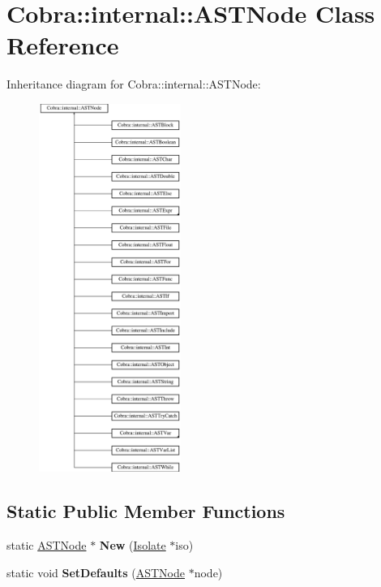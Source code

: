 \hypertarget{class_cobra_1_1internal_1_1_a_s_t_node}{\section{Cobra\+:\+:internal\+:\+:A\+S\+T\+Node Class Reference}
\label{class_cobra_1_1internal_1_1_a_s_t_node}
}
Inheritance diagram for Cobra\+:\+:internal\+:\+:A\+S\+T\+Node\+:\begin{figure}[H]
\begin{center}
\leavevmode
\includegraphics[height=12.000000cm]{class_cobra_1_1internal_1_1_a_s_t_node}
\end{center}
\end{figure}
\subsection*{Static Public Member Functions}
\begin{DoxyCompactItemize}
\item 
\hypertarget{class_cobra_1_1internal_1_1_a_s_t_node_af0d28a5cab4bc78d576d036b55f834f4}{static \hyperlink{class_cobra_1_1internal_1_1_a_s_t_node}{A\+S\+T\+Node} $\ast$ {\bfseries New} (\hyperlink{class_cobra_1_1internal_1_1_isolate}{Isolate} $\ast$iso)}\label{class_cobra_1_1internal_1_1_a_s_t_node_af0d28a5cab4bc78d576d036b55f834f4}

\item 
\hypertarget{class_cobra_1_1internal_1_1_a_s_t_node_a1b29f5beb1d464b2e50b57d3372f2f38}{static void {\bfseries Set\+Defaults} (\hyperlink{class_cobra_1_1internal_1_1_a_s_t_node}{A\+S\+T\+Node} $\ast$node)}\label{class_cobra_1_1internal_1_1_a_s_t_node_a1b29f5beb1d464b2e50b57d3372f2f38}

\end{DoxyCompactItemize}

